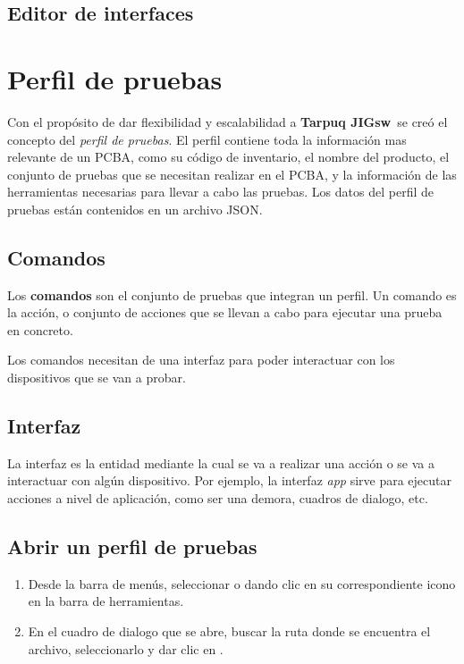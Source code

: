 \documentclass[a4paper,12pt]{refart}
\newcommand\tarpuqJIGsw{\textbf{Tarpuq JIGsw}}
\begin{document}
\subsection{Editor de interfaces}

\newpage

\section{Perfil de pruebas}
Con el propósito de dar flexibilidad y escalabilidad a \tarpuqJIGsw\, se creó el concepto del \textit{perfil de pruebas}. El perfil contiene toda la información mas relevante de un PCBA, como su código de inventario, el nombre del producto, el conjunto de pruebas que se necesitan realizar en el PCBA, y la información de las herramientas necesarias para llevar a cabo las pruebas. Los datos del perfil de pruebas están contenidos en un archivo JSON.

\subsection{Comandos}
Los \textbf{comandos} son el conjunto de pruebas que integran un perfil. Un comando es la acción, o conjunto de acciones que se llevan a cabo para ejecutar una prueba en concreto.

Los comandos necesitan de una interfaz para poder interactuar con los dispositivos que se van a probar.

\subsection{Interfaz} \label{defInterfaz}
La interfaz es la entidad mediante la cual se va a realizar una acción o se va a interactuar con algún dispositivo. Por ejemplo, la interfaz \textit{app} sirve para ejecutar acciones a nivel de aplicación, como ser una demora, cuadros de dialogo, etc.

\subsection{Abrir un perfil de pruebas} \label{loadProfile}
\begin{enumerate}
\item Desde la barra de menús, seleccionar  o dando clic en su correspondiente icono en la barra de herramientas.
\item En el cuadro de dialogo que se abre, buscar la ruta donde se encuentra el archivo, seleccionarlo y dar clic en .
\end{enumerate}
\end{document}
